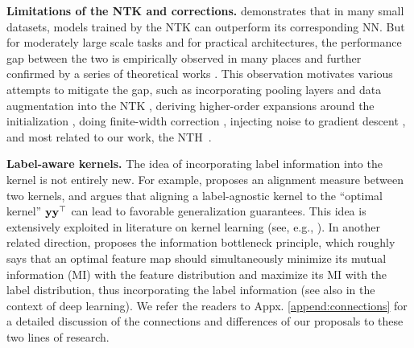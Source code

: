 {\bf Limitations of the NTK and corrections.} \cite{arora2019harnessing} demonstrates that in many small datasets, models trained by the NTK can outperform its corresponding NN. But for moderately large scale tasks and for practical architectures, the performance gap between the two is empirically observed in many places and further confirmed by a series of theoretical works \citep{chizat2019lazy,ghorbani2019linearized,yehudai2019power,bietti2019inductive,ghorbani2019limitations,wei2019regularization,allen2019can}. This observation motivates various attempts to mitigate the gap, such as incorporating pooling layers and data augmentation into the NTK \citep{li2019enhanced}, deriving higher-order expansions around the initialization \citep{bai2019beyond,bai2020taylorized}, doing finite-width correction \citep{hanin2019finite}, injecting noise to gradient descent \citep{chen2020generalized}, and most related to our work, the NTH~\citep{huang2019dynamics}. 

{\bf Label-aware kernels.} The idea of incorporating label information into the kernel is not entirely new. For example, \cite{cristianini2002kernel} proposes an alignment measure between two kernels, and argues that aligning a label-agnostic kernel to the ``optimal kernel'' ${\mathbf{y}}{\mathbf{y}}^\top$ can lead to favorable generalization guarantees. This idea is extensively exploited in literature on kernel learning (see, e.g., \citealt{lanckriet2004learning,cortes2012l2,gonen2011multiple}). 
In another related direction, \cite{tishby2000information} proposes the information bottleneck principle, which roughly says that an optimal feature map should simultaneously minimize its mutual information (MI) with the feature distribution and maximize its MI with the label distribution, thus incorporating the label information (see also \citealt{tishby2015deep} in the context of deep learning). 
We refer the readers to Appx. \ref{append:connections} for a detailed discussion of the connections and differences of our proposals to these two lines of research.
